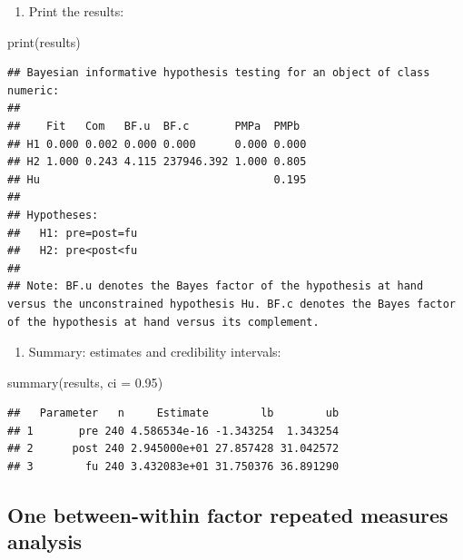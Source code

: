 \documentclass[
]{book}
\newenvironment{Shaded}{\begin{snugshade}}{\end{snugshade}}
\newcommand{\AttributeTok}[1]{\textcolor[rgb]{0.77,0.63,0.00}{#1}}
\newcommand{\FloatTok}[1]{\textcolor[rgb]{0.00,0.00,0.81}{#1}}
\newcommand{\FunctionTok}[1]{\textcolor[rgb]{0.00,0.00,0.00}{#1}}
\newcommand{\NormalTok}[1]{#1}
\providecommand{\tightlist}{%
  \setlength{\itemsep}{0pt}\setlength{\parskip}{0pt}}
\begin{document}
\begin{enumerate}
\def\labelenumi{\arabic{enumi})}
\setcounter{enumi}{4}
\tightlist
\item
  Print the results:
\end{enumerate}

\begin{Shaded}
\begin{Highlighting}[]
\FunctionTok{print}\NormalTok{(results)}
\end{Highlighting}
\end{Shaded}

\begin{verbatim}
## Bayesian informative hypothesis testing for an object of class numeric:
## 
##    Fit   Com   BF.u  BF.c       PMPa  PMPb 
## H1 0.000 0.002 0.000 0.000      0.000 0.000
## H2 1.000 0.243 4.115 237946.392 1.000 0.805
## Hu                                    0.195
## 
## Hypotheses:
##   H1: pre=post=fu
##   H2: pre<post<fu
## 
## Note: BF.u denotes the Bayes factor of the hypothesis at hand versus the unconstrained hypothesis Hu. BF.c denotes the Bayes factor of the hypothesis at hand versus its complement.
\end{verbatim}

\begin{enumerate}
\def\labelenumi{\arabic{enumi})}
\setcounter{enumi}{5}
\tightlist
\item
  Summary: estimates and credibility intervals:
\end{enumerate}

\begin{Shaded}
\begin{Highlighting}[]
\FunctionTok{summary}\NormalTok{(results, }\AttributeTok{ci =} \FloatTok{0.95}\NormalTok{)}
\end{Highlighting}
\end{Shaded}

\begin{verbatim}
##   Parameter   n     Estimate        lb        ub
## 1       pre 240 4.586534e-16 -1.343254  1.343254
## 2      post 240 2.945000e+01 27.857428 31.042572
## 3        fu 240 3.432083e+01 31.750376 36.891290
\end{verbatim}

\hypertarget{one-between-within-factor-repeated-measures-analysis}{%
\subsection{One between-within factor repeated measures analysis}\label{one-between-within-factor-repeated-measures-analysis}}
\end{document}
